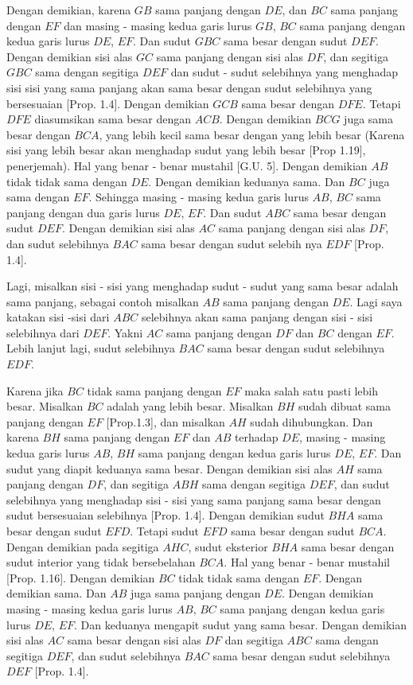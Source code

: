 \documentclass[a4paper]{book}
\begin{document}
Dengan demikian, karena $GB$ sama panjang dengan $DE$, dan $BC$ sama panjang 
dengan $EF$ dan masing - masing kedua garis lurus $GB$, $BC$ sama panjang dengan 
kedua garis lurus $DE$, $EF$. Dan sudut $GBC$ sama besar dengan sudut  $DEF$.
Dengan demikian sisi alas $GC$ sama panjang dengan sisi alas $DF$, dan segitiga
$GBC$ sama dengan segitiga  $DEF$ dan sudut - sudut selebihnya yang menghadap
sisi sisi yang sama panjang akan sama besar dengan sudut selebihnya yang 
bersesuaian [Prop. 1.4]. Dengan demikian $GCB$ sama besar dengan $DFE$. Tetapi
$DFE$ diasumsikan sama besar dengan $ACB$. Dengan demikian $BCG$ juga sama
besar dengan $BCA$, yang lebih kecil sama besar dengan yang lebih besar 
(Karena sisi yang lebih besar akan menghadap sudut yang lebih 
besar [Prop 1.19], penerjemah).
Hal yang benar - benar mustahil [G.U. 5]. Dengan demikian $AB$ tidak tidak sama dengan
$DE$. Dengan demikian keduanya sama. Dan $BC$ juga sama dengan $EF$. Sehingga
masing - masing kedua garis lurus $AB$, $BC$ sama panjang dengan dua garis 
lurus $DE$, $EF$. Dan sudut $ABC$ sama besar dengan sudut $DEF$. Dengan demikian
sisi alas $AC$ sama panjang dengan sisi alas $DF$, dan sudut selebihnya $BAC$ 
sama besar dengan sudut selebih nya $EDF$ [Prop. 1.4].

Lagi, misalkan sisi - sisi yang menghadap sudut - sudut yang sama besar adalah
sama panjang, sebagai contoh misalkan $AB$ sama panjang dengan $DE$. Lagi saya
katakan sisi -sisi dari $ABC$ selebihnya akan sama panjang dengan sisi - sisi
 selebihnya dari $DEF$. Yakni $AC$ sama panjang dengan $DF$ dan $BC$ dengan 
$EF$. Lebih lanjut lagi, sudut selebihnya $BAC$ sama besar dengan sudut 
selebihnya $EDF$.

Karena jika $BC$ tidak sama panjang dengan $EF$ maka salah satu pasti lebih besar.
Misalkan $BC$ adalah yang lebih besar. 
Misalkan $BH$ sudah dibuat sama panjang dengan $EF$ [Prop.1.3], 
dan misalkan $AH$ sudah dihubungkan. Dan karena $BH$ sama
panjang dengan $EF$ dan $AB$ terhadap $DE$, masing - masing kedua garis lurus 
$AB$, $BH$ sama panjang dengan kedua garis lurus $DE$, $EF$. Dan sudut yang
diapit keduanya sama besar. Dengan demikian sisi alas $AH$ sama panjang dengan 
$DF$, dan segitiga $ABH$ sama dengan segitiga $DEF$, dan sudut selebihnya yang
menghadap sisi - sisi yang sama panjang sama besar dengan sudut bersesuaian 
selebihnya [Prop. 1.4]. Dengan demikian sudut $BHA$ sama besar dengan sudut
$EFD$. Tetapi sudut $EFD$ sama besar dengan sudut $BCA$. Dengan demikian pada 
segitiga $AHC$, sudut eksterior $BHA$ sama besar dengan sudut interior yang tidak
bersebelahan $BCA$. Hal yang benar - benar mustahil [Prop. 1.16]. Dengan demikian 
$BC$ tidak tidak sama dengan $EF$. Dengan demikian sama. Dan $AB$ juga sama
panjang dengan $DE$. Dengan demikian masing - masing kedua garis lurus 
$AB$, $BC$ sama panjang dengan kedua garis lurus $DE$, $EF$. Dan keduanya mengapit
sudut yang sama besar. Dengan demikian sisi alas $AC$ sama besar dengan sisi 
alas $DF$ dan segitiga $ABC$ sama dengan segitiga $DEF$, dan sudut selebihnya
$BAC$ sama besar dengan sudut selebihnya $DEF$ [Prop. 1.4].
\end{document}
